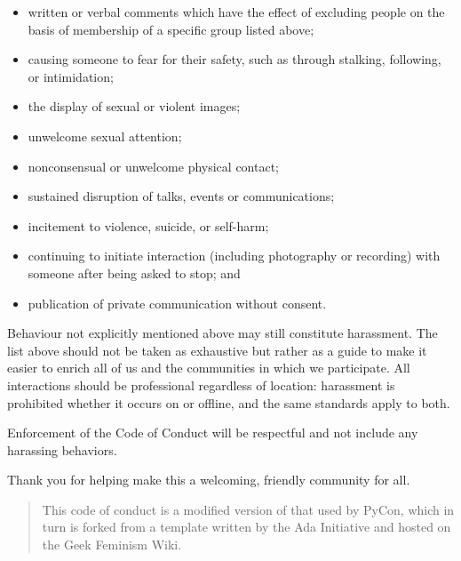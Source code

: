 \begin{itemize}

\item
  written or verbal comments which have the effect of excluding people
  on the basis of membership of a specific group listed above;

\item
  causing someone to fear for their safety, such as through stalking,
  following, or intimidation;

\item
  the display of sexual or violent images;

\item
  unwelcome sexual attention;

\item
  nonconsensual or unwelcome physical contact;

\item
  sustained disruption of talks, events or communications;

\item
  incitement to violence, suicide, or self-harm;

\item
  continuing to initiate interaction (including photography or
  recording) with someone after being asked to stop; and

\item
  publication of private communication without consent.

\end{itemize}

Behaviour not explicitly mentioned above may still constitute
harassment.  The list above should not be taken as exhaustive but
rather as a guide to make it easier to enrich all of us and the
communities in which we participate.  All interactions should be
professional regardless of location: harassment is prohibited whether
it occurs on or offline, and the same standards apply to both.

Enforcement of the Code of Conduct will be respectful and not include
any harassing behaviors.

Thank you for helping make this a welcoming, friendly community for
all.

\begin{quotation}

  This code of conduct is a modified version of that used by PyCon,
  which in turn is forked from a template written by the Ada
  Initiative and hosted on the Geek Feminism Wiki.

\end{quotation}
